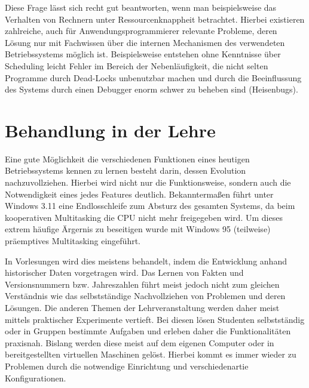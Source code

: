 		Diese Frage lässt sich recht gut beantworten, wenn man beispielsweise das Verhalten von Rechnern unter Ressourcenknappheit betrachtet. Hierbei existieren zahlreiche, auch für Anwendungsprogrammierer relevante Probleme, deren Lösung nur mit Fachwissen über die internen Mechanismen des verwendeten Betriebssystems möglich ist. 
		Beispielsweise entstehen ohne Kenntnisse über Scheduling leicht Fehler im Bereich der Nebenläufigkeit, die nicht selten Programme durch Dead-Locks unbenutzbar machen und durch die Beeinflussung des Systems durch einen Debugger enorm schwer zu beheben sind (Heisenbugs).





\section{Behandlung in der Lehre}
\label{sec:teaching}

		Eine gute Möglichkeit die verschiedenen Funktionen eines heutigen Betriebssystems kennen zu lernen besteht darin, dessen Evolution nachzuvollziehen. Hierbei wird nicht nur die Funktionsweise, sondern auch die Notwendigkeit eines jedes Features deutlich. 
		Bekanntermaßen führt unter Windows 3.11 eine Endlosschleife zum Absturz des gesamten Systems, da beim kooperativen Multitasking die CPU nicht mehr freigegeben wird.
		Um dieses extrem häufige Ärgernis zu beseitigen wurde mit Windows 95 (teilweise) präemptives Multitasking eingeführt.

		In Vorlesungen wird dies meistens behandelt, indem  die Entwicklung anhand historischer Daten vorgetragen wird.
		Das Lernen von Fakten und Versionsnummern bzw. Jahreszahlen führt meist jedoch nicht zum gleichen Verständnis wie das selbstständige Nachvollziehen von Problemen und deren Lösungen.
		Die anderen Themen der Lehrveranstaltung werden daher meist mittels praktischer Experimente vertieft.
		Bei diesen lösen Studenten selbstständig oder in Gruppen bestimmte Aufgaben und erleben daher die Funktionalitäten praxisnah.
		Bislang werden diese meist auf dem eigenen Computer oder in bereitgestellten virtuellen Maschinen gelöst.
		Hierbei kommt es immer wieder zu Problemen durch die notwendige Einrichtung und verschiedenartie Konfigurationen.

